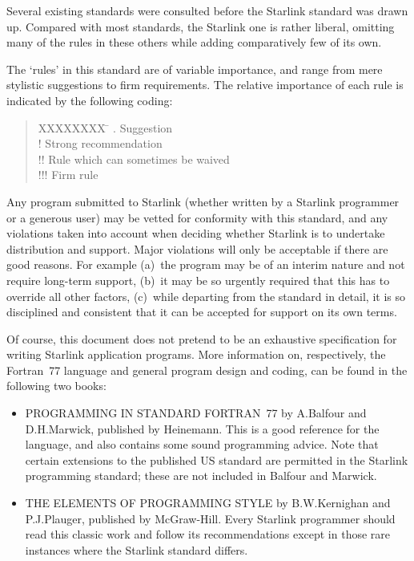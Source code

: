 \documentclass[twoside,11pt,nolof,noabs]{starlink}
\renewcommand{\_}{{\tt\char'137}}
\begin{document}
Several existing standards were consulted before the Starlink
standard was drawn up.
Compared with most standards,
the Starlink one is rather liberal, omitting many of the rules in
these others while adding comparatively few of its own.

The `rules' in this standard are of variable importance, and range from mere
stylistic suggestions to firm requirements.
The relative importance of each rule is indicated by the following coding:
\begin{quote}
\begin{tabbing}
XXXXXXXX \= \kill
.   \> Suggestion \\
!   \> Strong recommendation \\
!!  \> Rule which can sometimes be waived \\
!!! \> Firm rule \\
\end{tabbing}
\end{quote}
Any program submitted to Starlink (whether written by a Starlink programmer or
a generous user) may be vetted for conformity with this standard, and any
violations taken into account when deciding whether Starlink is to undertake
distribution and support.
Major violations will only be acceptable if there are good reasons.
For example
(a)~the program may be of an interim nature and not require
long-term support,
(b)~it may be so urgently required that this has to override all other factors,
(c)~while departing from the standard in detail, it is so disciplined and
consistent that it can be accepted for support on its own terms.

Of course, this document does not pretend to be an exhaustive specification for
writing Starlink application programs.
More information on, respectively, the Fortran~77 language and general program
design and coding, can be found in the following two books:
\begin{itemize}
\item PROGRAMMING IN STANDARD FORTRAN~77 by A.Balfour and D.H.Marwick,
published by Heinemann.
This is a good reference for the language, and also contains some sound
programming advice.
Note that certain extensions to the published US standard are permitted in the
Starlink programming standard; these are not included in Balfour and Marwick.
\item THE ELEMENTS OF PROGRAMMING STYLE by B.W.Kernighan and P.J.Plauger,
published by McGraw-Hill.
Every Starlink programmer should read this classic
work and follow its recommendations
except in those rare instances where the Starlink standard differs.
\end{itemize}
\end{document}
